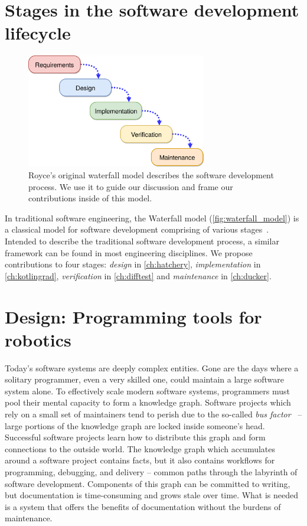 \documentclass[12pt,initial,twoside,maitrise]{dms}
\numberwithin{equation}{section}
\numberwithin{table}{chapter}
\numberwithin{figure}{chapter}
\begin{document}
\section{Stages in the software development lifecycle}\label{sec:sldc-stages}

\begin{figure}
    \centering
    \includegraphics[width=0.70\textwidth]{../figures/waterfall_diagram.png}
    \caption{Royce's original waterfall model describes the software development process. We use it to guide our discussion and frame our contributions inside of this model.\vspace{-10pt}}
    \label{fig:waterfall_model}
\end{figure}

In traditional software engineering, the Waterfall model (\autoref{fig:waterfall_model}) is a classical model for software development comprising of various stages~\citep{royce1987managing}. Intended to describe the traditional software development process, a similar framework can be found in most engineering disciplines. We propose contributions to four stages: \textit{design} in \autoref{ch:hatchery}, \textit{implementation} in \autoref{ch:kotlingrad}, \textit{verification} in \autoref{ch:difftest} and \textit{maintenance} in \autoref{ch:ducker}.

\section{Design: Programming tools for robotics}

Today's software systems are deeply complex entities. Gone are the days where a solitary programmer, even a very skilled one, could maintain a large software system alone. To effectively scale modern software systems, programmers must pool their mental capacity to form a knowledge graph. Software projects which rely on a small set of maintainers tend to perish due to the so-called \textit{bus factor}~\citep{cosentino2015assessing} -- large portions of the knowledge graph are locked inside someone's head. Successful software projects learn how to distribute this graph and form connections to the outside world. The knowledge graph which accumulates around a software project contains facts, but it also contains workflows for programming, debugging, and delivery -- common paths through the labyrinth of software development. Components of this graph can be committed to writing, but documentation is time-consuming and grows stale over time. What is needed is a system that offers the benefits of documentation without the burdens of maintenance.
\end{document}
